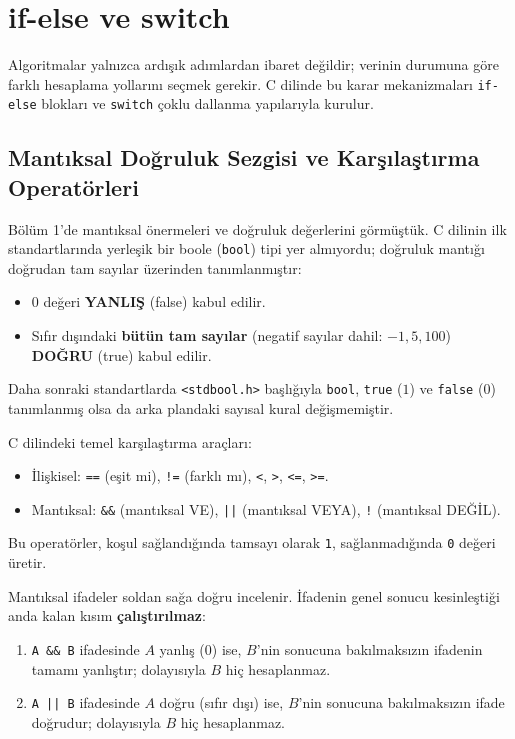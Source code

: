 \newpage

\section{if-else ve switch}

Algoritmalar yalnızca ardışık adımlardan ibaret değildir; verinin durumuna göre farklı hesaplama yollarını seçmek gerekir. C dilinde bu karar mekanizmaları \texttt{if-else} blokları ve \texttt{switch} çoklu dallanma yapılarıyla kurulur.

\subsection{Mantıksal Doğruluk Sezgisi ve Karşılaştırma Operatörleri}

Bölüm 1'de mantıksal önermeleri ve doğruluk değerlerini görmüştük. C dilinin ilk standartlarında yerleşik bir boole (\texttt{bool}) tipi yer almıyordu; doğruluk mantığı doğrudan tam sayılar üzerinden tanımlanmıştır:
\begin{itemize}
    \item $0$ değeri \textbf{YANLIŞ} (false) kabul edilir.
    \item Sıfır dışındaki \textbf{bütün tam sayılar} (negatif sayılar dahil: $-1, 5, 100$) \textbf{DOĞRU} (true) kabul edilir.
\end{itemize}
Daha sonraki standartlarda \texttt{<stdbool.h>} başlığıyla \texttt{bool}, \texttt{true} ($1$) ve \texttt{false} ($0$) tanımlanmış olsa da arka plandaki sayısal kural değişmemiştir.

\begin{definition}
C dilindeki temel karşılaştırma araçları:
\begin{itemize}
    \item İlişkisel: \texttt{==} (eşit mi), \texttt{!=} (farklı mı), \texttt{<}, \texttt{>}, \texttt{<=}, \texttt{>=}.
    \item Mantıksal: \texttt{\&\&} (mantıksal VE), \texttt{||} (mantıksal VEYA), \texttt{!} (mantıksal DEĞİL).
\end{itemize}
Bu operatörler, koşul sağlandığında tamsayı olarak \texttt{1}, sağlanmadığında \texttt{0} değeri üretir.
\end{definition}

\begin{theorem}
Mantıksal ifadeler soldan sağa doğru incelenir. İfadenin genel sonucu kesinleştiği anda kalan kısım \textbf{çalıştırılmaz}:
\begin{enumerate}
    \item \texttt{A \&\& B} ifadesinde $A$ yanlış ($0$) ise, $B$'nin sonucuna bakılmaksızın ifadenin tamamı yanlıştır; dolayısıyla $B$ hiç hesaplanmaz.
    \item \texttt{A || B} ifadesinde $A$ doğru (sıfır dışı) ise, $B$'nin sonucuna bakılmaksızın ifade doğrudur; dolayısıyla $B$ hiç hesaplanmaz.
\end{enumerate}
\end{theorem}

